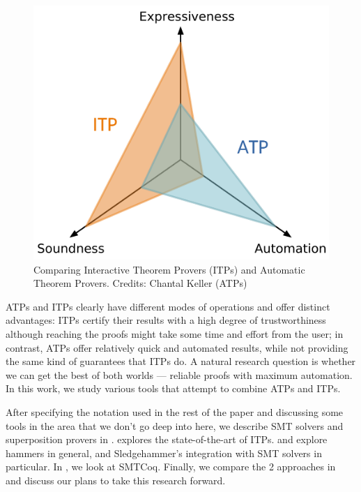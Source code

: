 \documentclass{article}
\begin{document}
	\begin{figure}[t]
		\centering
		\includegraphics[scale=0.5]{coq.pdf}
		\caption{Comparing Interactive Theorem Provers (ITPs)
		and Automatic Theorem Provers. Credits: Chantal 
		Keller (ATPs)}
		\label{fig:graph}
	\end{figure}

	ATPs and ITPs clearly have different modes of operations
	and offer distinct advantages: ITPs certify their 
	results with a high degree of trustworthiness although 
	reaching the proofs might take some time and effort from 
	the user; in contrast, ATPs offer relatively quick and automated results, 
	while not providing the same kind of guarantees that ITPs do.
	A natural research question is whether we can get the best 
	of both worlds --- reliable proofs with maximum automation. 
	In this work, we study various tools that 
	attempt to combine ATPs and ITPs.
	
	After specifying the notation used in the rest of the 
	paper and discussing some tools in the area that 
	we don't go deep into here, we describe SMT solvers
	and superposition provers in .
	 explores the state-of-the-art 
	of ITPs.  and 
	explore hammers in general, and Sledgehammer's
	integration with SMT solvers in particular. In
	, we look at SMTCoq. Finally, we 
	compare the 2 approaches in ~ and 
	discuss our plans to take this research forward.
\end{document}

